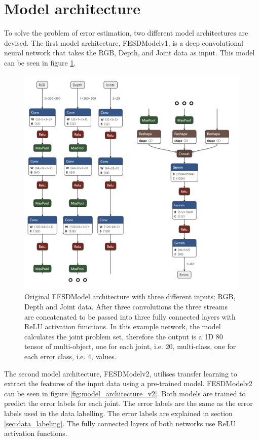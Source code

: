 \section{Model architecture}
\label{sec:model_architecture}

To solve the problem of error estimation, two different model architectures are devised. The first model architecture, FESDModelv1, is a deep convolutional neural network that takes the RGB, Depth, and Joint data as input. This model can be seen in figure \ref{fig:model_architecture_v1}. 

\begin{figure}[ht]
  \centering
  \includegraphics[width=.8\linewidth]{figures/Model/FESD.png}
  \caption[FESDModel architecture version 1]{Original FESDModel architecture with three different inputs; RGB, Depth and Joint data. After three convolutions the three streams are concatenated to be passed into three fully connected layers with ReLU activation functions. In this example network, the model calculates the joint problem set, therefore the output is a 1D 80 tensor of multi-object, one for each joint, i.e. 20, multi-class, one for each error class, i.e. 4, values.}
  \label{fig:model_architecture_v1}
\end{figure}

The second model architecture, FESDModelv2, utilises transfer learning to extract the features of the input data using a pre-trained model. FESDModelv2 can be seen in figure \ref{fig:model_architecture_v2}. Both models are trained to predict the error labels for each joint. The error labels are the same as the error labels used in the data labelling. The error labels are explained in section \ref{sec:data_labeling}. The fully connected layers of both networks use ReLU activation functions.

